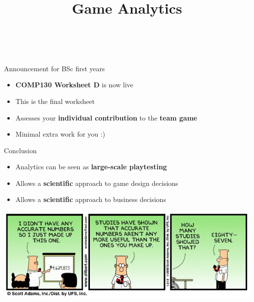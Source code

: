 \usepackage{../../beamerthemeFalmouthGamesAcademy}
\usepackage{multimedia}
\graphicspath{ {../../} }


\usepackage[normalem]{ulem}
\usepackage{wasysym}

\usepackage{pdfpages}

\usetikzlibrary{arrows,automata}




\title{Game Analytics}
\subtitle{\modulecode\ \moduletitle}

\frame{\titlepage}

\begin{frame}{Announcement for BSc first years}
	\begin{itemize}
		\pause\item \textbf{COMP130 Worksheet D} is now live
		\pause\item This is the final worksheet
		\pause\item Assesses your \textbf{individual contribution} to the \textbf{team game}
		\pause\item Minimal extra work for you :)
	\end{itemize}
\end{frame}











\begin{frame}{Conclusion}
	\begin{itemize}
		\pause\item Analytics can be seen as \textbf{large-scale playtesting}
		\pause\item Allows a \textbf{scientific} approach to game design decisions
		\pause\item Allows a \textbf{scientific} approach to business decisions
	\end{itemize}
\end{frame}

\begin{frame}
	\begin{center}
		\includegraphics[width=\textwidth]{dilbert}
	\end{center}
\end{frame}


